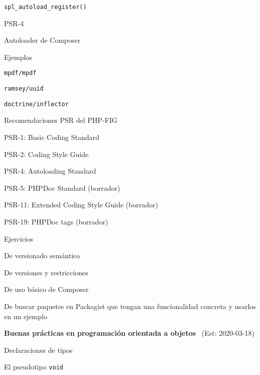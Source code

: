 \begin{longenum}
\begin{longenum}
        \begin{longenum}
            \item \texttt{spl\_autoload\_register()}
            \item PSR-4
            \item Autoloader de Composer
        \end{longenum}
        \item Ejemplos
        \begin{longenum}
            \item \texttt{mpdf/mpdf}
            \item \texttt{ramsey/uuid}
            \item \texttt{doctrine/inflector}
        \end{longenum}
        \item Recomendaciones PSR del PHP-FIG
        \begin{longenum}
            \item PSR-1: Basic Coding Standard
            \item PSR-2: Coding Style Guide
            \item PSR-4: Autoloading Standard
            \item PSR-5: PHPDoc Standard (borrador)
            \item PSR-11: Extended Coding Style Guide (borrador)
            \item PSR-19: PHPDoc tags (borrador)
        \end{longenum}
        \item Ejercicios
        \begin{longenum}
            \item De versionado semántico
            \item De versiones y restricciones
            \item De uso básico de Composer
            \item De buscar paquetes en Packagist que tengan una funcionalidad concreta y usarlos en un ejemplo
        \end{longenum}
    \end{longenum}
    \item \textbf{Buenas prácticas en programación orientada a objetos} \ (Est: 2020-03-18)
    \begin{longenum}
        \item Declaraciones de tipos
        \begin{longenum}
            \item El pseudotipo \texttt{void}

\end{longenum}
\end{longenum}
\end{longenum}
